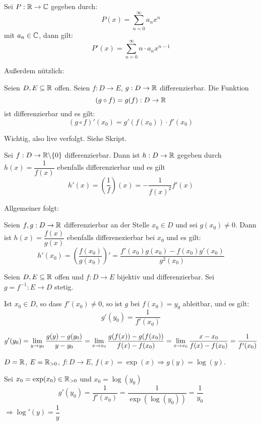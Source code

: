 \documentclass[main.tex]{subfiles}
\begin{document}
\begin{Theorem}
  Sei $P: \mathbb{R} \to \mathbb{C}$ gegeben durch:
  $$P(x) = \sum \limits_{n = 0}^\infty a_n x^n$$
  mit $a_n \in \mathbb{C}$, dann gilt:
  $$P'(x) = \sum \limits_{n = 0}^\infty n \cdot a_n x^{n-1}$$
\end{Theorem}

Außerdem nützlich:
\begin{Theorem}[Kettenregel]
  Seien $D, E \subseteq \mathbb{R}$ offen. Seien $f: D \to E$, $g: D \to \mathbb{R}$ differenzierbar. Die Funktion
  $$(g \circ f) = g(f): D \to \mathbb{R}$$
  ist differenzierbar und es gilt:
  $$ (g \circ f)'(x_0) = g'(f(x_0)) \cdot f'(x_0)$$
\end{Theorem}

\begin{Beweis}
  Wichtig, also live verfolgt. Siehe Skript.
\end{Beweis}

\begin{Beispiel}
  Sei $f : D \to \mathbb{R}\backslash\{0\}$ differenzierbar. Dann ist $h: D \to \mathbb{R}$ gegeben durch $h(x) = \dfrac{1}{f(x)}$ ebenfalls differenzierbar und es gilt
  $$h'(x) = \left(\dfrac{1}{f}\right)(x) = - \dfrac{1}{f(x)^2}f'(x)$$
\end{Beispiel}

Allgemeiner folgt:
\begin{Theorem}[Quotientenregel]
  Seien $f,g:D\to \mathbb{R}$ differenzierbar an der Stelle $x_0 \in D$ und sei $g(x_0) \neq 0$. Dann ist $h(x) = \dfrac{f(x)}{g(x)}$ ebenfalls differenezierbar bei $x_0$ und es gilt:
  $$h'(x_0) = \left(\dfrac{f(x_0)}{g(x_0)}\right)' = \dfrac{f'(x_0)g(x_0) - f(x_0)g'(x_0)}{g^2(x_0)}$$
\end{Theorem}

\begin{Theorem}[Inversenregel]
  Seien $D,E \subseteq \mathbb{R}$ offen und $f: D \to E$ bijektiv und differenzierbar. Sei $g = f^{-1} : E \to D$ stetig.

  Ist $x_0 \in D$, so dass $f'(x_0) \neq 0$, so ist $g$ bei $f(x_0) = y_0$ ableitbar, und es gilt:
  $$g'(y_0) = \dfrac{1}{f'(x_0)}$$
\end{Theorem}

\begin{Beweis}
  $$g'(y_0) = \lim \limits_{y \to y_0} \dfrac{g(y)-g(y_0)}{y - y_0} = \lim \limits_{x \to x_0} \dfrac{g(f(x))-g(f(x_0))}{f(x) - f(x_0)} = \lim \limits_{x \to x_0} \dfrac{x - x_0}{f(x) - f(x_0)} = \dfrac{1}{f'(x_0)}$$
\end{Beweis}

\begin{Beispiel}
  $D = \mathbb{R}$, $E = \mathbb{R}_{> 0}$, $f: D \to E$, $f(x) = \exp(x) \Rightarrow g(y) = \log(y)$.

  Sei $x_0 = \exp(x_0) \in \mathbb{R}_{>0}$ und $x_0 = \log(y_0)$
  $$g'(y_0) = \dfrac{1}{f'(x_0)} = \dfrac{1}{\exp(\log(y_0))} = \dfrac{1}{y_0}$$
  $\Rightarrow \log'(y) = \dfrac{1}{y}$
\end{Beispiel}
\end{document}
